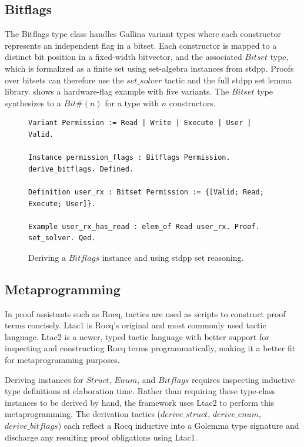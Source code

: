 \documentclass[fontset=fira-newtxsf]{mitthesis}
\theoremstyle{definition}
\theoremstyle{plain}
\begin{document}
\subsection{Bitflags} \label{sec:Golemma-bitflag}
The Bitflags type class handles Gallina variant types where each constructor represents an independent flag in a bitset.
Each constructor is mapped to a distinct bit position in a fixed-width bitvector, and the associated $\mathit{Bitset}$ type, which is formalized as a finite set using set-algebra instances from stdpp.
Proofs over bitsets can therefore use the $\mathit{set\_solver}$ tactic and the full stdpp set lemma library.
 shows a hardware-flag example with five variants.
The $\mathit{Bitset}$ type synthesizes to a $\mathit{Bit}\#(n)$ for a type with $n$ constructors.

\begin{figure}[H]
\begin{verbatim}
Variant Permission := Read | Write | Execute | User | Valid.

Instance permission_flags : Bitflags Permission. derive_bitflags. Defined.

Definition user_rx : Bitset Permission := {[Valid; Read; Execute; User]}.

Example user_rx_has_read : elem_of Read user_rx. Proof. set_solver. Qed.
\end{verbatim}
\caption[Bitflags example]{Deriving a $\mathit{Bitflags}$ instance and using stdpp set reasoning.}
\label{fig:synth-bitflags}
\end{figure}

\subsection{Metaprogramming} \label{par:ltac2}
In proof assistants such as Rocq, tactics are used as scripts to construct proof terms concisely.
Ltac1 is Rocq's original and most commonly used tactic language.
Ltac2 is a newer, typed tactic language with better support for inspecting and constructing Rocq terms programmatically, making it a better fit for metaprogramming purposes.

Deriving instances for $\mathit{Struct}$, $\mathit{Enum}$, and $\mathit{Bitflags}$ requires inspecting inductive type definitions at elaboration time.
Rather than requiring these type-class instances to be derived by hand, the framework uses Ltac2 to perform this metaprogramming.
The derivation tactics ($\mathit{derive\_struct}$, $\mathit{derive\_enum}$, $\mathit{derive\_bitflags}$) each reflect a Rocq inductive into a Golemma type signature and discharge any resulting proof obligations using Ltac1.
\end{document}

